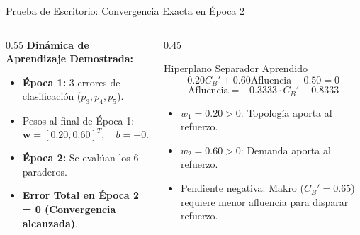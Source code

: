 \documentclass[aspectratio=169,10pt]{beamer}
\begin{document}
\begin{frame}{Prueba de Escritorio: Convergencia Exacta en Época 2}
    \begin{columns}[T]
        \begin{column}{0.55\textwidth}
            \textbf{Dinámica de Aprendizaje Demostrada:}
            \begin{itemize}
                \item \textbf{Época 1:} 3 errores de clasificación ($p_3, p_4, p_5$).
                \item Pesos al final de Época 1:
                $$\mathbf{w} = [0.20, 0.60]^T, \quad b = -0.50$$
                \item \textbf{Época 2:} Se evalúan los 6 paraderos.
                \item \textbf{Error Total en Época 2 = 0 (Convergencia alcanzada)}.
            \end{itemize}
        \end{column}
        \begin{column}{0.45\textwidth}
            \begin{block}{Hiperplano Separador Aprendido}
                $$0.20 C_B' + 0.60 \text{Afluencia} - 0.50 = 0$$
                $$\text{Afluencia} = -0.3333 \cdot C_B' + 0.8333$$
                \begin{itemize}
                    \item $w_1 = 0.20 > 0$: Topología aporta al refuerzo.
                    \item $w_2 = 0.60 > 0$: Demanda aporta al refuerzo.
                    \item Pendiente negativa: Makro ($C_B'=0.65$) requiere menor afluencia para disparar refuerzo.
                \end{itemize}
            \end{block}
        \end{column}
    \end{columns}
\end{frame}
\end{document}
